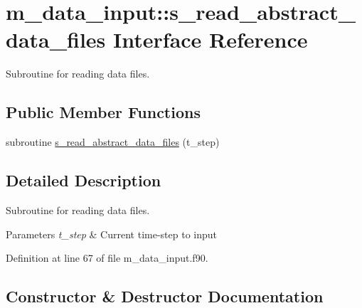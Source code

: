 \hypertarget{interfacem__data__input_1_1s__read__abstract__data__files}{}\section{m\+\_\+data\+\_\+input\+:\+:s\+\_\+read\+\_\+abstract\+\_\+data\+\_\+files Interface Reference}
\label{interfacem__data__input_1_1s__read__abstract__data__files}


Subroutine for reading data files.  


\subsection*{Public Member Functions}
\begin{DoxyCompactItemize}
\item 
subroutine \hyperlink{interfacem__data__input_1_1s__read__abstract__data__files_a1b2b5ddb6cb7db1b2faf1aea24d1318b}{s\+\_\+read\+\_\+abstract\+\_\+data\+\_\+files} (t\+\_\+step)
\end{DoxyCompactItemize}


\subsection{Detailed Description}
Subroutine for reading data files. 


\begin{DoxyParams}{Parameters}
{\em t\+\_\+step} & Current time-\/step to input \\
\hline
\end{DoxyParams}


Definition at line 67 of file m\+\_\+data\+\_\+input.\+f90.



\subsection{Constructor \& Destructor Documentation}
\mbox{\label{interfacem__data__input_1_1s__read__abstract__data__files_a1b2b5ddb6cb7db1b2faf1aea24d1318b}} 
